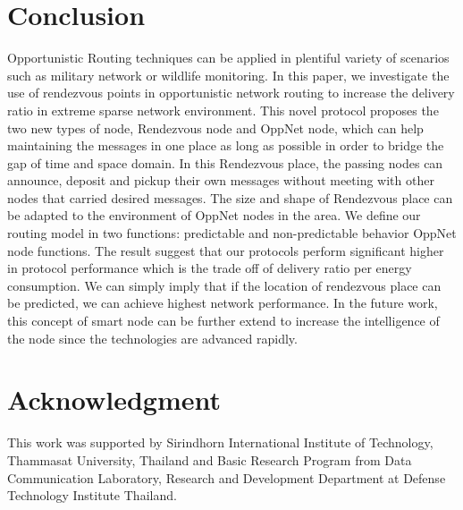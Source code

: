 \documentclass[conference]{IEEEtran}
\begin{document}
\section{Conclusion}
Opportunistic Routing techniques can be applied in  plentiful variety of scenarios such as military network or wildlife monitoring. 
In this paper, we investigate the use of rendezvous points in opportunistic network routing to increase the delivery ratio in extreme sparse network environment.
This novel protocol proposes the two new types of node, Rendezvous node and OppNet node, which can help maintaining the messages in one place as long as possible in order to bridge the gap of time and space domain.
In this Rendezvous place, the passing nodes can announce, deposit and pickup their own messages without meeting with other nodes that carried desired messages.
The size and shape of  Rendezvous place can be adapted to the environment of OppNet nodes in the area.
We define our routing model in two functions: predictable  and non-predictable behavior OppNet node functions.
The result suggest that our protocols perform significant higher in protocol performance which is the trade off of delivery ratio per energy consumption.
We can simply imply that if the location of rendezvous place can be predicted, we can achieve highest network performance.
In the future work, this concept of smart node can be further extend to increase the intelligence of the node since the technologies are advanced rapidly.


\section*{Acknowledgment}
This work was supported by Sirindhorn International Institute of Technology, Thammasat University, Thailand and Basic Research Program from Data Communication Laboratory, Research and Development Department at Defense Technology Institute Thailand.



\end{document}
